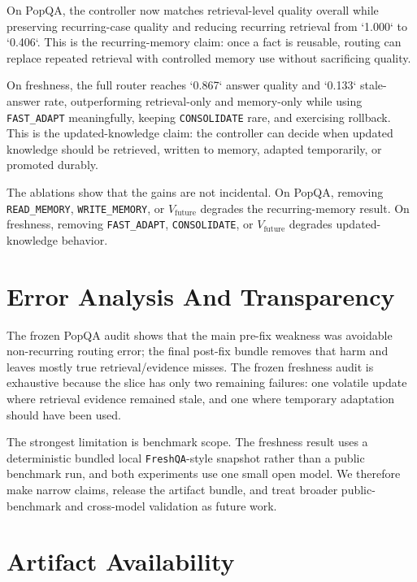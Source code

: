 On PopQA, the controller now matches retrieval-level quality overall while preserving recurring-case quality and reducing recurring retrieval from `1.000` to `0.406`. This is the recurring-memory claim: once a fact is reusable, routing can replace repeated retrieval with controlled memory use without sacrificing quality.

\begin{table}[h]
\centering
\tiny

\caption{Freshness main result from the frozen \texttt{freshness\_v1} bundle.}
\label{tab:w-freshness}
\end{table}

On freshness, the full router reaches `0.867` answer quality and `0.133` stale-answer rate, outperforming retrieval-only and memory-only while using \texttt{FAST\_ADAPT} meaningfully, keeping \texttt{CONSOLIDATE} rare, and exercising rollback. This is the updated-knowledge claim: the controller can decide when updated knowledge should be retrieved, written to memory, adapted temporarily, or promoted durably.

\begin{table}[h]
\centering
\small

\caption{Compact ablation summary across the two frozen benchmarks.}
\label{tab:w-ablations}
\end{table}

The ablations show that the gains are not incidental. On PopQA, removing \texttt{READ\_MEMORY}, \texttt{WRITE\_MEMORY}, or $V_{\text{future}}$ degrades the recurring-memory result. On freshness, removing \texttt{FAST\_ADAPT}, \texttt{CONSOLIDATE}, or $V_{\text{future}}$ degrades updated-knowledge behavior.

\section{Error Analysis And Transparency}

The frozen PopQA audit shows that the main pre-fix weakness was avoidable non-recurring routing error; the final post-fix bundle removes that harm and leaves mostly true retrieval/evidence misses. The frozen freshness audit is exhaustive because the slice has only two remaining failures: one volatile update where retrieval evidence remained stale, and one where temporary adaptation should have been used.

The strongest limitation is benchmark scope. The freshness result uses a deterministic bundled local \texttt{FreshQA}-style snapshot rather than a public benchmark run, and both experiments use one small open model. We therefore make narrow claims, release the artifact bundle, and treat broader public-benchmark and cross-model validation as future work.

\section{Artifact Availability}


